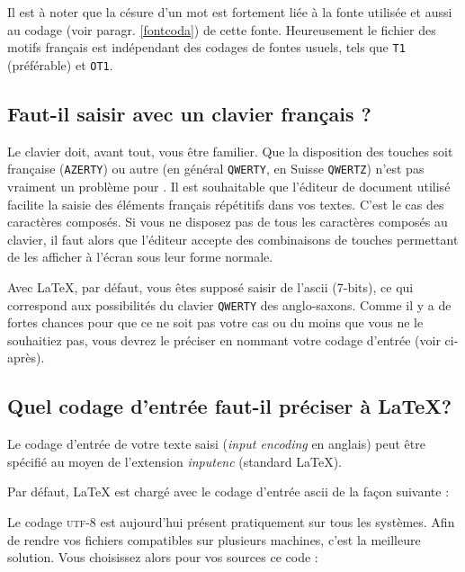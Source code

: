 \documentclass[a4paper,12pt,openright]{article}
\begin{document}
Il est à noter que la césure d'un mot est fortement liée à la fonte utilisée
et aussi au codage (voir paragr. \ref{fontcoda}) de cette fonte. Heureusement le fichier
des motifs français est indépendant des codages de fontes usuels, tels que \texttt{T1}
 (préférable) et \texttt{OT1}.
\subsection{ Faut-il saisir avec un clavier français ?}
 Le clavier doit, avant tout, vous être familier. 
Que la disposition des touches  soit française
(\texttt{AZERTY}) ou autre (en général \texttt{QWERTY}, en Suisse \texttt{QWERTZ}) 
n'est pas vraiment un problème pour
\pgLapdTeX. Il est souhaitable que l'éditeur de document utilisé facilite la saisie
des éléments français répétitifs dans vos textes. C'est le cas des caractères
composés. Si vous ne disposez pas de tous les caractères composés au clavier,
il faut alors que l'éditeur accepte des combinaisons de touches permettant de
les afficher à l'écran sous leur forme normale. 

\indpos Avec \LaTeX, par défaut, vous êtes supposé saisir de l'{\sc ascii} (7-bits), ce qui
correspond aux possibilités du clavier \texttt{QWERTY} des anglo-saxons. Comme il y a
de fortes chances pour que ce ne soit pas votre cas ou du moins que vous ne
le souhaitiez pas, vous devrez le préciser en nommant votre codage d'entrée
(voir ci-après).
\subsection{Quel codage d'entrée faut-il préciser à \LaTeX?}
\label{inenco}
 Le codage d'entrée de votre texte saisi ({\it input encoding} en anglais)
peut être spécifié au moyen de l'extension  \textit{inputenc}
(standard \LaTeX).

 Par défaut, \LaTeX{} est chargé avec le codage d'entrée {\sc ascii} de la façon
suivante :\indpos
\begin{center}
\end{center}
\begin{MAJ}

Le codage \textsc{utf-8} est aujourd'hui présent pratiquement sur tous les systèmes.
Afin de rendre vos fichiers compatibles sur plusieurs machines,
c'est la meilleure solution.
Vous choisissez alors pour vos sources \pgLapdTeX ce code :
\begin{center}
\end{center}
\end{MAJ}
\end{document}
